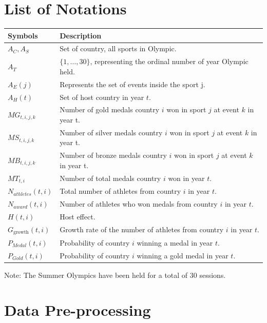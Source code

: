 \documentclass{mcmthesis}
\begin{document}
\section{List of Notations}
\begin{center}
	\begin{tabular}{ll}
		\toprule
		{\bf Symbols} & {\bf Description}  \\
		\midrule 
		$A_{C},A_{S}$ & Set of country, all sports in Olympic.\\
		$A_{T}$ & $\{1,\dots,30\}$, representing the ordinal number of year Olympic held. \\
		$A_E(j)$ & Represents the set of events inside the sport j.\\
		$A_{H}(t)$ & Set of host country in year $t$. \\
		$MG_{t,i,j,k}$ & Number of gold medals country $i$ won in sport $j$ at event $k$ in year t. \\
		$MS_{t,i,j,k}$ & Number of silver medals country $i$ won in sport $j$ at event $k$ in year t. \\
		$MB_{t,i,j,k}$ & Number of bronze medals country $i$ won in sport $j$ at event $k$ in year t. \\
		$MT_{t,i}$ & Number of total medals country $i$ won in year $t$. \\
		$N_{athletes}(t,i)$ & Total number of athletes from country $i$ in year $t$. \\
		$N_{award}(t,i)$ & Number of athletes who won medals from country $i$ in year $t$. \\
		$H(t,i)$ & Host effect. \\
		$G_{\text{growth}}(t,i)$ & Growth rate of the number of athletes from country $i$ in year $t$.\\
		$P_{Medal}(t,i)$ & Probability of country $i$ winning a medal in year $t$.\\
		$P_{Gold}(t,i)$ & Probability of country $i$ winning a gold medal in year $t$.\\
		\bottomrule
	\end{tabular}
\end{center}

\noindent Note: The Summer Olympics have been held for a total of 30 sessions.
	
%	
%	
%	
%	
%	
%	
%	
%	
\section{Data Pre-processing}
\end{document}

